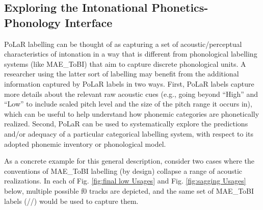 \documentclass[11pt, twoside]{memoir}
\def\polar#1{{\relsize{-.5}\fontspec[Mapping=tex-text]{Roboto Mono}{#1}}}
\def\tobi#1{\polar{#1}}
\begin{document}
\subsection{Exploring the Intonational Phonetics-Phonology Interface}\label{sec:exploring-phonetics-phonology-interface}
PoLaR labelling can be thought of as capturing a set of acoustic\slash perceptual characteristics of intonation in a way that is different from phonological labelling systems (like MAE\_ToBI) that aim to capture discrete phonological units. A researcher using the latter sort of labelling may benefit from the additional information captured by PoLaR labels in two ways. First, PoLaR labels capture more details about the relevant raw acoustic cues (e.g., going beyond “High” and “Low” to include scaled pitch level and the size of the pitch range it occurs in), which can be useful to help understand how phonemic categories are phonetically realized. Second, PoLaR can be used to systematically explore the predictions and/or adequacy of a particular categorical labelling system, with respect to its adopted phonemic inventory or phonological model.

As a concrete example for this general description, consider two cases where the conventions of MAE\_ToBI labelling (by design) collapse a range of acoustic realizations. In each of Fig. \ref{fig:final low Usages} and Fig. \ref{fig:sagging Usages} below, multiple possible f0 tracks are depicted, and the same set of MAE\_ToBI labels (/\tobi{H* H* L-L\%}/) would be used to capture them.
\end{document}
